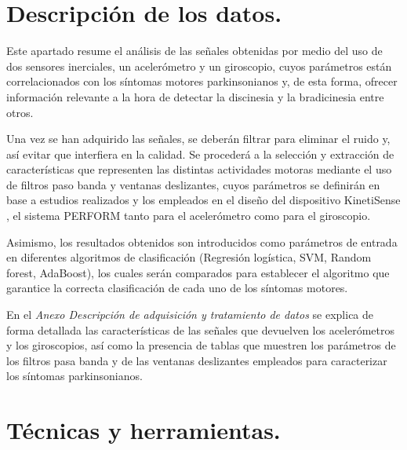 
\section{Descripción de los datos.}

Este apartado resume el análisis de las señales obtenidas por medio del uso de dos sensores inerciales, un acelerómetro y un giroscopio, cuyos parámetros están correlacionados con los síntomas motores parkinsonianos y, de esta forma, ofrecer información relevante a la hora de detectar la discinesia y la bradicinesia entre otros. 

Una vez se han adquirido las señales, se deberán filtrar para eliminar el ruido y, así evitar que interfiera en la calidad. Se procederá a la selección y extracción de características que representen las distintas actividades motoras mediante el uso de filtros paso banda y ventanas deslizantes, cuyos parámetros se definirán en base a estudios realizados y los empleados en el diseño del dispositivo KinetiSense \cite{mera2013quantitative}, el sistema PERFORM \cite{tzallas2014perform} tanto para el acelerómetro como para el giroscopio. 

Asimismo, los resultados obtenidos son introducidos como parámetros de entrada en diferentes algoritmos de clasificación (Regresión logística, SVM, Random forest, AdaBoost), los cuales serán comparados para establecer el algoritmo que garantice la correcta clasificación de cada uno de los síntomas motores.


En el \textit{Anexo Descripción de adquisición y tratamiento de datos} se explica de forma detallada las características de las señales que devuelven los acelerómetros y los giroscopios, así como la presencia de tablas que muestren los parámetros de los filtros pasa banda y de las ventanas deslizantes empleados para caracterizar los síntomas parkinsonianos. 
 
\section{Técnicas y herramientas.}




